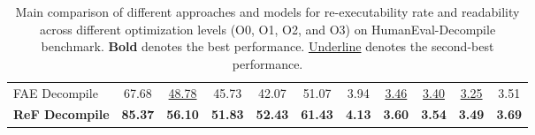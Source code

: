 \begin{table*}
\begin{adjustbox}{width=\textwidth}
\begin{tabular}{lcccccccccc}
            FAE Decompile                                                                            & 67.68                                     & \underline{48.78}                              & 45.73          & 42.07          & 51.07          & 3.94 & \underline{3.46} & \underline{3.40} & \underline{3.25} & 3.51 \\
            \textbf{ReF Decompile}                                                                   & \textbf{85.37}                            & \textbf{56.10}                     & \textbf{51.83} & \textbf{52.43}          & \textbf{61.43} & \textbf{4.13} & \textbf{3.60} & \textbf{3.54} & \textbf{3.49} & \textbf{3.69} \\
            \bottomrule
        \end{tabular}
    \end{adjustbox}
    \caption{Main comparison of different approaches and models for re-executability rate
    and readability across different optimization levels (O0, O1, O2, and O3) on HumanEval-Decompile benchmark. \textbf{Bold} denotes the best performance.
    \underline{Underline} denotes the second-best performance.
    }
    \label{table:main}
\end{table*}